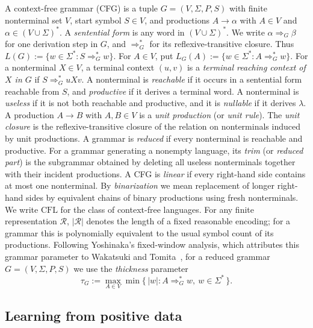 \documentclass[11pt,a4paper]{article}
\theoremstyle{remark}
\theoremstyle{plain}
\begin{document}
A context-free grammar (CFG) is a tuple $G=(V,\Sigma,P,S)$ with finite
nonterminal set $V$, start symbol $S\in V$, and productions
$A\to\alpha$ with $A\in V$ and $\alpha\in(V\cup\Sigma)^*$.
A \emph{sentential form} is any word in $(V\cup\Sigma)^*$.  We write
$\alpha\Rightarrow_G\beta$ for one derivation step in $G$, and
$\Rightarrow_G^*$ for its reflexive-transitive closure.  Thus $L(G):=\{w\in\Sigma^*:S\Rightarrow_G^*w\}$.  For $A\in V$, put
$L_G(A):=\{w\in\Sigma^*:A\Rightarrow_G^*w\}$.
For a nonterminal $X\in V$, a terminal context $(u,v)$ is a
\emph{terminal reaching context of $X$ in $G$} if
$S\Rightarrow_G^*uXv$.
A nonterminal is \emph{reachable} if it occurs in a sentential form reachable
from $S$, and \emph{productive} if it derives a terminal word.  A nonterminal
is \emph{useless} if it is not both reachable and productive, and it is
\emph{nullable} if it derives $\lambda$.  A production $A\to B$ with
$A,B\in V$ is a \emph{unit production} (or \emph{unit rule}).  The
\emph{unit closure} is the reflexive-transitive closure of the relation on
nonterminals induced by unit productions.  A grammar is \emph{reduced} if
every nonterminal is reachable and productive.  For a grammar generating a
nonempty language, its \emph{trim} (or \emph{reduced part}) is the subgrammar
obtained by deleting all useless nonterminals together with their incident
productions.  A CFG is \emph{linear} if every right-hand side contains at
most one nonterminal.  By \emph{binarization} we mean replacement of longer
right-hand sides by equivalent chains of binary productions using fresh
nonterminals.
We write $\mathrm{CFL}$ for the class of context-free languages.  For any
finite representation $\mathcal R$, $|\mathcal R|$ denotes the length of a fixed reasonable
encoding; for a grammar this is polynomially equivalent to the usual symbol
count of its productions.  Following Yoshinaka's fixed-window analysis, which attributes this grammar parameter to Wakatsuki and Tomita~\cite{yoshinaka2008}, for a reduced grammar $G=(V,\Sigma,P,S)$ we use the \emph{thickness} parameter
\[
 \tau_G:=\max_{A\in V}\min\{\,|w|:A\Rightarrow_G^*w,\ w\in\Sigma^*\,\}.
\]

\subsection{Learning from positive data}\label{sec:learning}
\end{document}
